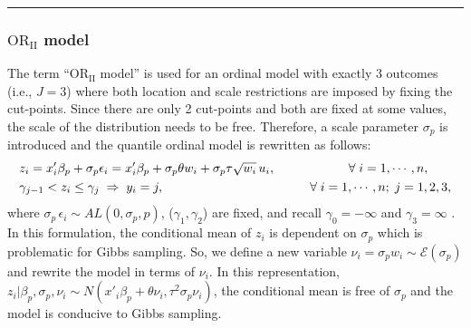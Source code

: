 \noindent

\rule{\textwidth}{0.5pt}

\hypertarget{sec:ORII}{%
\subsubsection{\texorpdfstring{\(\mathrm{OR_{II}}\) model}{\textbackslash mathrm\{OR\_\{II\}\} model}}\label{sec:ORII}}

The term ``\(\mathrm{OR_{II}}\) model'' is used for an ordinal model with exactly 3 outcomes (i.e., \(J = 3\)) where both location and scale restrictions are imposed by fixing the cut-points. Since there are only 2 cut-points and both are fixed at some values, the scale of the distribution needs to be free. Therefore, a scale parameter \(\sigma_{p}\) is introduced and the quantile ordinal model is rewritten as follows:
\begin{equation} 
\begin{split} 
 & z_{i} = x'_{i} \beta_{p} + \sigma_{p} \epsilon_{i}
          = x'_{i} \beta_{p}  + \sigma_{p} \theta w_{i} + \sigma_{p} \tau \sqrt{w_{i}} \,u_{i}, \hspace{0.8in} \forall \; i=1, \cdots, n, \\
& \gamma_{j-1} < z_{i} \le \gamma_{j} \; \Rightarrow \; y_{i} = j,
\hspace{1.6 in} \forall \; i=1,\cdots, n; \; j=1,2, 3, \end{split}
\label{eq:ORII}
\end{equation}
where \(\sigma_{p} \, \epsilon_{i} \sim AL(0, \sigma_{p}, p)\), (\(\gamma_{1},\gamma_{2}\)) are fixed, and recall \(\gamma_{0}=-\infty\) and \(\gamma_{3}=\infty\) . In this formulation, the conditional mean of \(z_{i}\) is dependent on \(\sigma_{p}\) which is problematic for Gibbs sampling. So, we define a new variable \(\nu_{i} = \sigma_{p} w_{i} \sim \mathcal{E}(\sigma_{p})\) and rewrite the model in terms of \(\nu_{i}\). In this representation, \(z_{i}|\beta_{p},\sigma_{p},\nu_{i} \sim N(x'_{i}\beta_{p} + \theta \nu_{i}, \tau^{2} \sigma_{p} \nu_{i})\), the conditional mean is free of \(\sigma_{p}\) and the model is conducive to Gibbs sampling.

